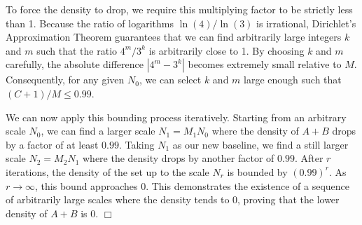         To force the density to drop, we require this multiplying factor to be strictly less than 1. Because the ratio of logarithms $\ln(4)/\ln(3)$ is irrational, Dirichlet's Approximation Theorem guarantees that we can find arbitrarily large integers $k$ and $m$ such that the ratio $4^m / 3^k$ is arbitrarily close to 1. By choosing $k$ and $m$ carefully, the absolute difference $|4^m - 3^k|$ becomes extremely small relative to $M$. Consequently, for any given $N_0$, we can select $k$ and $m$ large enough such that $(C + 1)/M \leq 0.99$.
        
        We can now apply this bounding process iteratively. Starting from an arbitrary scale $N_0$, we can find a larger scale $N_1 = M_1 N_0$ where the density of $A + B$ drops by a factor of at least $0.99$. Taking $N_1$ as our new baseline, we find a still larger scale $N_2 = M_2 N_1$ where the density drops by another factor of $0.99$. After $r$ iterations, the density of the set up to the scale $N_r$ is bounded by $(0.99)^r$. As $r \to \infty$, this bound approaches 0. This demonstrates the existence of a sequence of arbitrarily large scales where the density tends to 0, proving that the lower density of $A + B$ is 0. \hfill $\Box$